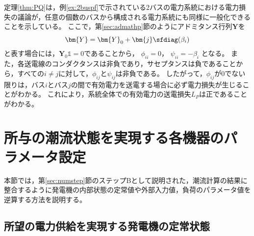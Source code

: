 \documentclass[tombow,dvipdfmx]{corona-a5}
\begin{document}
定理\ref{thm:PQ}は，例\ref{ex:2buspf}で示されている2バスの電力系統における電力損失の議論が，任意の個数のバスから構成される電力系統にも同様に一般化できることを示している。
ここで，第\ref{sec:admathp}節のようにアドミタンス行列$\bm{Y}$を
\[
\bm{Y}=\bm{Y}_0 + \bm{j} \sfdiag(\beta_i)
\]
と表す場合には，$\bm{Y}_0 \mathds{1}=0$であることから，
$\phi_{ii}=0$，
$\psi_{ii}= - \beta_i$
となる。
また，各送電線のコンダクタンスは非負であり，サセプタンスは負であることから，すべての$i\neq j$に対して，$\phi_{ij} $と$\psi_{ij}$は非負である。
したがって，$\phi_{ij}$が0でない限りは，バス$i$とバス$j$の間で有効電力を送電する場合に必ず電力損失が生じることがわかる。
これにより，系統全体での有効電力の送電損失$L_P$は正であることがわかる。


\section{所与の潮流状態を実現する各機器のパラメータ設定}\label{sec:paradef}

本節では，第\ref{sec:numstep}節のステップBとして説明された，潮流計算の結果に整合するように発電機の内部状態の定常値や外部入力値，負荷のパラメータ値を逆算する方法を説明する。


\subsection{所望の電力供給を実現する発電機の定常状態}\label{sec:stagen}
\end{document}
